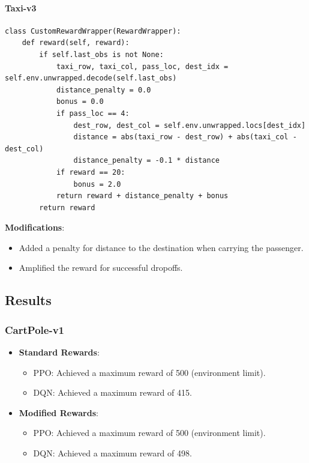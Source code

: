 \documentclass[12pt]{article}
\begin{document}
{{{\paragraph*{Taxi-v3}
\begin{verbatim}
class CustomRewardWrapper(RewardWrapper):
    def reward(self, reward):
        if self.last_obs is not None:
            taxi_row, taxi_col, pass_loc, dest_idx = self.env.unwrapped.decode(self.last_obs)
            distance_penalty = 0.0
            bonus = 0.0
            if pass_loc == 4:
                dest_row, dest_col = self.env.unwrapped.locs[dest_idx]
                distance = abs(taxi_row - dest_row) + abs(taxi_col - dest_col)
                distance_penalty = -0.1 * distance
            if reward == 20:
                bonus = 2.0
            return reward + distance_penalty + bonus
        return reward
\end{verbatim}
\textbf{Modifications}:
\begin{itemize}
    \item Added a penalty for distance to the destination when carrying the passenger.
    \item Amplified the reward for successful dropoffs.
\end{itemize}

\subsection*{Results}

\subsubsection*{CartPole-v1}
\begin{itemize}
    \item \textbf{Standard Rewards}:
    \begin{itemize}
        \item PPO: Achieved a maximum reward of 500 (environment limit).
        \item DQN: Achieved a maximum reward of 415.
    \end{itemize}
    \item \textbf{Modified Rewards}:
    \begin{itemize}
        \item PPO: Achieved a maximum reward of 500 (environment limit).
        \item DQN: Achieved a maximum reward of 498.
    \end{itemize}
\end{itemize}

}}}
\end{document}
